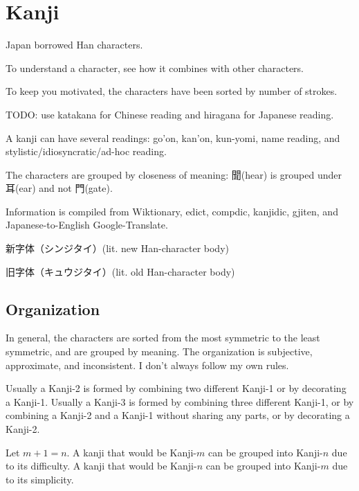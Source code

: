 \chapter{Kanji}

Japan borrowed Han characters.

To understand a character, see how it combines with other characters.

To keep you motivated, the characters have been sorted by number of strokes.

TODO: use katakana for Chinese reading and hiragana for Japanese reading.

A kanji can have several readings:
go'on, kan'on, kun-yomi, name reading, and stylistic/idiosyncratic/ad-hoc reading.

The characters are grouped by closeness of meaning:
聞(hear) is grouped under 耳(ear) and not 門(gate).

Information is compiled from Wiktionary,
edict, compdic, kanjidic, gjiten,
and Japanese-to-English Google-Translate.

新字体（シンジタイ）(lit. new Han-character body)

旧字体（キュウジタイ）(lit. old Han-character body)

\section{Organization}

In general, the characters are sorted
from the most symmetric to the least symmetric,
and are grouped by meaning.
The organization is subjective, approximate, and inconsistent.
I don't always follow my own rules.

Usually a Kanji-2 is formed by combining two different Kanji-1
or by decorating a Kanji-1.
Usually a Kanji-3 is formed by combining three different Kanji-1,
or by combining a Kanji-2 and a Kanji-1 without sharing any parts,
or by decorating a Kanji-2.

Let \(m+1 = n\).
A kanji that would be Kanji-\(m\)
can be grouped into Kanji-\(n\) due to its difficulty.
A kanji that would be Kanji-\(n\)
can be grouped into Kanji-\(m\) due to its simplicity.
